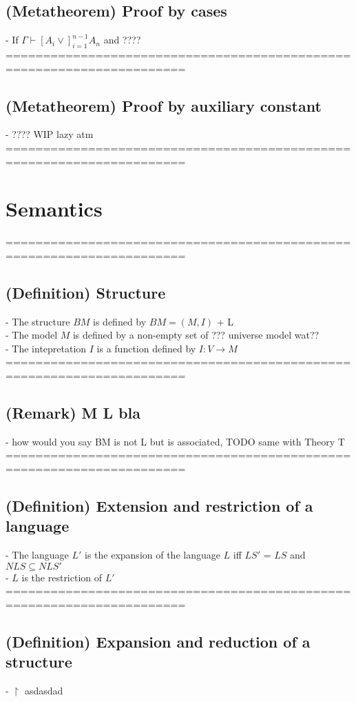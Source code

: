 \documentclass{article}
\begin{document}
\subsection{(Metatheorem) Proof by cases}
	- If $\Gamma \vdash [A_i \lor]_{i=1}^{n-1} A_n$ and ????
	======================================================================
\subsection{(Metatheorem) Proof by auxiliary constant}
	- ???? WIP lazy atm
	======================================================================

\section{Semantics}
	======================================================================
\subsection{(Definition) Structure}
	- The structure $BM$ is defined by $BM = (M, I)$ + L \\
	- The model $M$ is defined by a non-empty set of ??? universe model wat?? \\
	- The intepretation $I$ is a function defined by $I: V \rightarrow M$ \\
	======================================================================
\subsection{(Remark) M L bla}
	- how would you say BM is not L but is associated, TODO same with Theory T
	======================================================================
\subsection{(Definition) Extension and restriction of a language}
	- The language $L'$ is the expansion of the language $L$ iff $LS'$ = $LS$ and $NLS \subseteq NLS'$ \\
	- $L$ is the restriction of $L'$ \\
	======================================================================
\subsection{(Definition) Expansion and reduction of a structure}
	- $\upharpoonright$ asdasdad

\begin{comment}
Hotkeys:
Ctrl+R
Ctrl+K, Ctrl+1
Ctrl+K, Ctrl+J
Ctrl+Shift+[
Ctrl+Shift+[

TODO:
- fix hypothesis referencing - WITH Hypothesis (SOMETHING)
- fix \vdash \vDash writing metaproofs - consistency
- use cantor product + sequences instead kleene star 
- closed terms are important in semantics ?? review dis
\end{comment}
\end{document}
